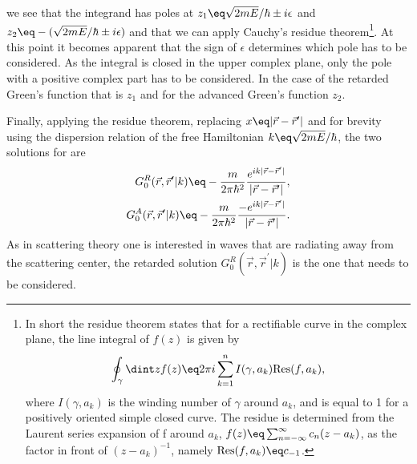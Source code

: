\documentclass[\main/dresen_thesis.tex]{subfiles}
\begin{document}
we see that the integrand has poles at $z_1 \eq \sqrt{2mE}/\hbar \pm i \epsilon$ and $z_2 \eq -(\sqrt{2mE}/\hbar \pm i \epsilon)$ and that we can apply Cauchy's residue theorem\footnote{
  In short the residue theorem states that for a rectifiable curve in the complex plane, the line integral of $f(z)$ is given by
  \begin{align}
    \oint_\gamma \dint z f(z) \eq 2 \pi i \sum_{k=1}^n I(\gamma, a_k) \mathrm{Res}(f, a_k)\nonumber,
  \end{align}
  where $I(\gamma, a_k)$ is the winding number of $\gamma$ around $a_k$, and is equal to 1 for a positively oriented simple closed curve. The residue is determined from the Laurent series expansion of f around $a_k$, $f(z) \eq \sum_{n=-\infty}^\infty c_n (z-a_k)$, as the factor in front of $(z - a_k)^{-1}$, namely $\mathrm{Res}(f, a_k) \eq c_{-1}$.
}.
At this point it becomes apparent that the sign of $\epsilon$ determines which pole has to be considered.
As the integral is closed in the upper complex plane, only the pole with a positive complex part has to be considered.
In the case of the retarded Green's function that is $z_1$ and for the advanced Green's function $z_2$.

Finally, applying the residue theorem, replacing $x \eq |\vec{r} - \vec{r}^\prime|$ and for brevity using the dispersion relation of the free Hamiltonian $k \eq \sqrt{2mE}/\hbar$, the two solutions for  are
\begin{align}
  G_0^R(\vec{r},  \vec{r}^\prime | k) \eq - \frac{m}{ 2\pi\hbar^2}  \frac {e^{i k |\vec{r} - \vec{r}^\prime|}}{|\vec{r} - \vec{r}^\prime|},\\
  G_0^A(\vec{r},  \vec{r}^\prime | k) \eq - \frac{m}{ 2\pi\hbar^2}  \frac {-e^{i k |\vec{r} - \vec{r}^\prime|}}{|\vec{r} - \vec{r}^\prime|}.
\end{align}
As in scattering theory one is interested in waves that are radiating away from the scattering center, the retarded solution $G_0^R(\vec{r},  \vec{r}^\prime | k)$ is the one that needs to be considered.
\end{document}
